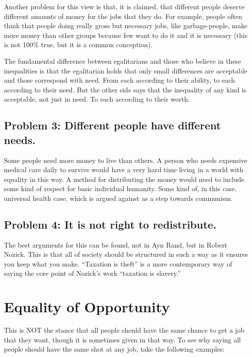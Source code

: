 Another problem for this view is that, it is claimed, that different people deserve different amounts of money for the jobs that they do. For example, people often think that people doing really gross but necessary jobs, like garbage-people, make more money than other groups because few want to do it and it is necessary (this is not 100\% true, but it is a common conception).

The fundamental difference between egalitarians and those who believe in these inequalities is that the egalitarian holds that only small differences are acceptable and those correspond with need. From each according to their ability, to each according to their need. But the other side says that the inequality of any kind is acceptable, not just in need. To each according to their worth.
\subsection{Problem 3: Different people have different needs.}

Some people need more money to live than others. A person who needs expensive medical care daily to survive would have a very hard time living in a world with equality in this way. A method for distributing the money would need to include some kind of respect for basic individual humanity. Some kind of, in this case, universal health case, which is argued against as a step towards communism. 
\subsection{Problem 4: It is not right to redistribute.}

The best arguments for this can be found, not in Ayn Rand, but in Robert Nozick. This is that all of society should be structured in such a way as it ensures you keep what you make. “Taxation is theft” is a more contemporary way of saying the core point of Nozick’s work “taxation is slavery.”

\section{Equality of Opportunity}

This is NOT the stance that all people should have the same chance to get a job that they want, though it is sometimes given in that way. To see why saying all people should have the same shot at any job, take the following examples:

